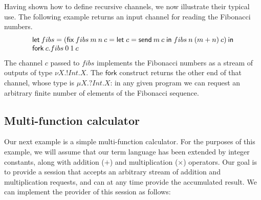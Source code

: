 \documentclass[orivec,envcountsame]{llncs}
\makeatletter
\newcommand{\mkwd}[1]{\mathsf{#1}}
\newcommand{\gvsend}[2]{\mkwd{send}\:#1\:#2}
\newcommand{\gvlet}[3]{\mkwd{let}\;#1 = #2\;\mkwd{in}\;#3}
\newcommand{\gvfork}[2]{\mkwd{fork}\:#1.#2}
\newcommand{\lrkwd}{\mkwd{fix}}
\newcommand{\gvfix}[3]{\lrkwd\:#1\:#2 = #3}
\newcommand{\key}{\mkwd}
\newcommand{\ba}{\begin{array}}
\newcommand{\ea}{\end{array}}
\newcommand{\bl}{\ba[t]{@{}l@{}}}
\newcommand{\el}{\ea}
\makeatother
\begin{document}
Having shown how to define recursive channels, we now illustrate their typical use. The following
example returns an input channel for reading the Fibonacci numbers.
\[
\bl
\key{let}\:fibs = (\gvfix{fibs}{m\:n\:c}{\gvlet{c}{\gvsend{m}{c}}{fibs\:n\:(m + n)\:c}})\:\key{in} \\
\gvfork{c}{fibs\:0\:1\:c} \\
\el
\]
The channel $c$ passed to $fibs$ implements the Fibonacci numbers as a stream of outputs of type
$\nu X.!Int.X$. The $\key{fork}$ construct returns the other end of that channel, whose type is $\mu
X.?Int.X$: in any given program we can request an arbitrary finite number of elements of the
Fibonacci sequence.

\subsection{Multi-function calculator}

Our next example is a simple multi-function calculator. For the purposes of this example, we will
assume that our term language has been extended by integer constants, along with addition ($+$) and
multiplication ($\times$) operators.  Our goal is to provide a session that accepts an arbitrary
stream of addition and multiplication requests, and can at any time provide the accumulated result.
We can implement the provider of this session as follows:

\newcommand{\mcl}[2]{\multicolumn{#1}{l}{#2}}
\end{document}
